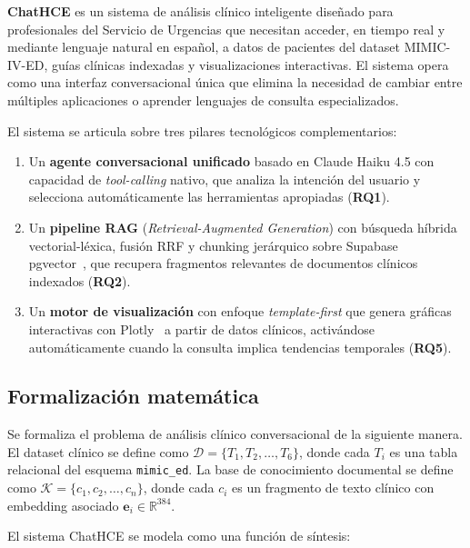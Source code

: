 \textbf{ChatHCE} es un sistema de análisis clínico inteligente diseñado para profesionales del Servicio de Urgencias que necesitan acceder, en tiempo real y mediante lenguaje natural en español, a datos de pacientes del dataset \acs{MIMIC}-IV-\acs{ED}, guías clínicas indexadas y visualizaciones interactivas. El sistema opera como una interfaz conversacional única que elimina la necesidad de cambiar entre múltiples aplicaciones o aprender lenguajes de consulta especializados.

El sistema se articula sobre tres pilares tecnológicos complementarios:

\begin{enumerate}[nosep, leftmargin=*]
  \item Un \textbf{agente conversacional unificado} basado en Claude Haiku 4.5 con capacidad de \textit{tool\mbox{-}calling} nativo, que analiza la intención del usuario y selecciona automáticamente las herramientas apropiadas (\textbf{RQ1}).
  \item Un \textbf{pipeline RAG} (\textit{Retrieval-Augmented Generation}) con búsqueda híbrida vectorial-léxica, fusión \ac{RRF} y chunking jerárquico sobre Supabase~\parencite{supabase2020} pgvector~\parencite{pgvector2024}, que recupera fragmentos relevantes de documentos clínicos indexados (\textbf{RQ2}).
  \item Un \textbf{motor de visualización} con enfoque \textit{template\mbox{-}first} que genera gráficas interactivas con Plotly~\parencite{plotly2015} a partir de datos clínicos, activándose automáticamente cuando la consulta implica tendencias temporales (\textbf{RQ5}).
\end{enumerate}

\subsection{Formalización matemática}
\label{sec:formalizacion}

Se formaliza el problema de análisis clínico conversacional de la siguiente manera. El dataset clínico se define como $\mathcal{D} = \{T_1, T_2, \ldots, T_6\}$, donde cada $T_i$ es una tabla relacional del esquema \texttt{mimic\_ed}. La base de conocimiento documental se define como $\mathcal{K} = \{c_1, c_2, \ldots, c_n\}$, donde cada $c_i$ es un fragmento de texto clínico con embedding asociado $\mathbf{e}_i \in \mathbb{R}^{384}$.

El sistema ChatHCE se modela como una función de síntesis:

